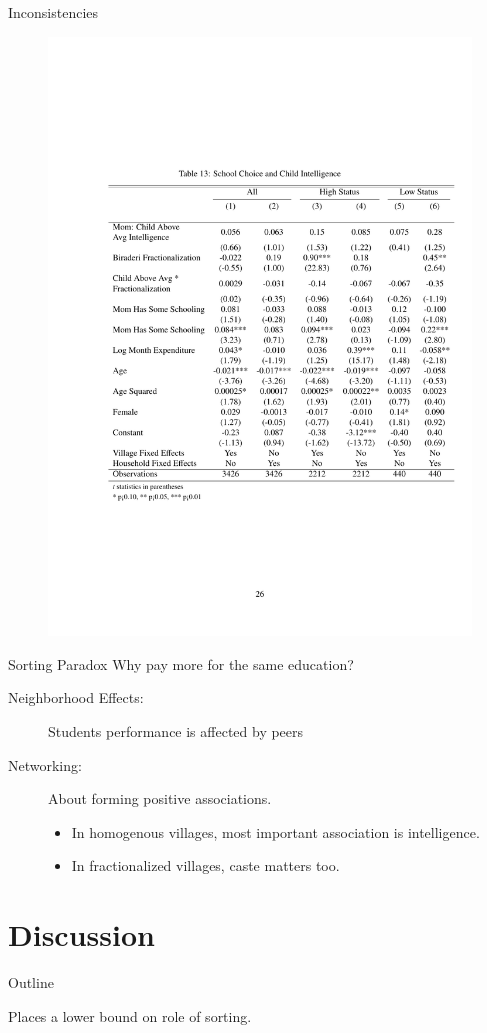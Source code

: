 \documentclass{beamer}
\begin{document}
\begin{frame}{Inconsistencies}
\begin{figure}[htb]
	\begin{center}
	\includegraphics[scale=0.6]{tables/choice_interactions.pdf}
	\end{center}
\end{figure}

\end{frame}

\begin{frame}{Sorting Paradox}
Why pay more for the same education?
\pause
\begin{description}
	\item [Neighborhood Effects:] Students performance is affected by peers
	\pause
	\item [Networking:] About forming positive associations. 
	\begin{itemize}
		\item In homogenous villages, most important association is intelligence.
		\item In fractionalized villages, caste matters too. 
	\end{itemize}
\end{description}
\end{frame}


\section{Discussion}\label{}
\begin{frame}{Outline}
	\tableofcontents[current]
\end{frame}


\begin{frame}{}
	Places a lower bound on role of sorting. 
\end{frame}
\end{document}
